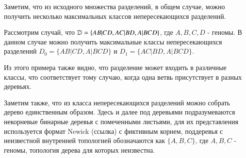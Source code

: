 Заметим, что из исходного множества разделений, в общем случае, можно получить несколько максимальных классов непересекающихся разделений.
\begin{example}
  Рассмотрим случай, что $\mathbb{D} = \{ AB|CD, AC|BD, A|BCD \}$, где $A, B, C, D$ - геномы.
  В данном случае можно получить максимальные классы непересекающихся разделений
  $D_0 = \{ AB|CD, A|BCD \}$ и $D_1 = \{ AC|BD, A|BCD \}$.
\end{example}
Из этого примера также видно, что разделение может входить в различные классы, что соответствует тому случаю, когда
одна ветвь присутствует в разных деревьях.


Заметим также, что из класса непересекающихся разделений можно собрать дерево единственным образом.
Здесь и далее под деревьями подразумеваются некорневые бинарные деревья с помеченными листьями,
для их представления используется формат Newick (ссылка) с фиктивным корнем,
поддеревья с неизвестной внутренней топологией обозначаются как $\{A, B, C\}$,
где $A, B, C$ - геномы, топология дерева для которых неизвестна.
